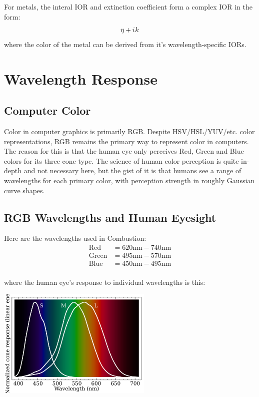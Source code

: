 \documentclass[12pt,letterpaper]{article}
\newcommand{\iu}{{i\mkern1mu}}
\begin{document}
For metals, the interal IOR and extinction coefficient form a complex IOR in the form:
$$\eta + \iu k$$
where the color of the metal can be derived from it's wavelength-specific IORs.

\newpage

\section{Wavelength Response}

\subsection{Computer Color}

Color in computer graphics is primarily RGB. Despite HSV/HSL/YUV/etc. color representations, RGB remains the primary way to 
represent color in computers. The reason for this is that the human eye only perceives Red, Green and Blue colors for its three cone type.
The science of human color perception is quite in-depth and not necessary here, but the gist of it is that humans see a range of wavelengths
for each primary color, with perception strength in roughly Gaussian curve shapes.

\subsection{RGB Wavelengths and Human Eyesight}

Here are the wavelengths used in Combustion:
\begin{align*}
    \text{Red}   &= 620\text{nm} - 740\text{nm}\\
    \text{Green} &= 495\text{nm} - 570\text{nm}\\
    \text{Blue}  &= 450\text{nm} - 495\text{nm}\\
\end{align*}

where the human eye's response to individual wavelengths is this:
\begin{center}
\includegraphics[width=20em]{Cone-fundamentals-with-srgb-spectrum}
\end{center}
\end{document}
